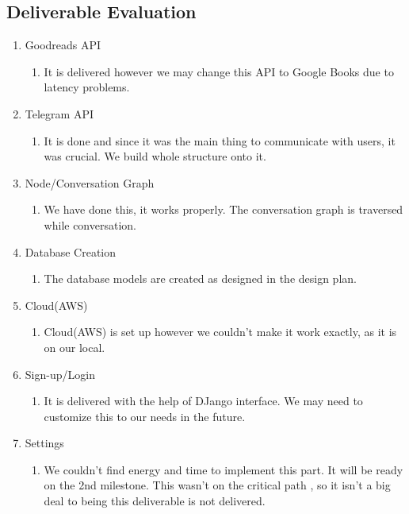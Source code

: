 \documentclass[a4paper]{article}
\begin{document}
\subsection{Deliverable Evaluation}
\begin{enumerate}
\item Goodreads API
\begin{enumerate}
  \item It is delivered however we may change this API to Google Books due to latency problems.
   \end{enumerate}
   \item 	Telegram API
   \begin{enumerate}
    \item It is done and since it was the main thing to communicate with users, it was crucial. We build whole structure onto it.
     \end{enumerate}
   \item  Node/Conversation Graph
   \begin{enumerate}
    \item We have done this, it works properly. The conversation graph is traversed while conversation.
   \end{enumerate}
   \item Database Creation	
   \begin{enumerate}
   \item The database models are created as designed in the design plan.
 	\end{enumerate}
 	\item 	Cloud(AWS)
 	\begin{enumerate}
 \item Cloud(AWS) is set up however we couldn't make it work exactly, as it is on our local.
 	\end{enumerate}
 	\item 	Sign-up/Login
 	\begin{enumerate}
 	\item	It is delivered with the help of DJango interface. We may need to customize this to our needs in the future. 
 	\end{enumerate}
 	\item 	Settings
 	\begin{enumerate}
 \item	We couldn't find energy and time to implement this part. It will be ready on the 2nd milestone. This wasn't on the critical path , so it isn't a big deal to being this deliverable is not delivered.
 	\end{enumerate}

\end{enumerate}
\end{document}
